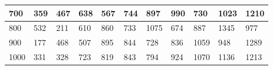 \documentclass[10pt,letterpaper]{article}
\begin{document}
\begin{center}
\begin{table}
\begin{tabular} { |m{0.5cm}|m{1.3cm}|m{1.3cm}|m{1.3cm}|m{1.3cm}|m{1.3cm}|m{1.3cm}|m{1.3cm}|m{1.3cm}|m{1.3cm}|m{1.3cm}|}
\hline
\cellcolor{Gray}700 & \Large 359 & \Large 467 & \Large 638 & \Large 567 & \Large 744 & \Large 897 & \Large 990 & \Large 730 & \Large 1023 & \Large 1210 \\
\hline
\cellcolor{Gray}800 & \Large 532 & \Large 211 & \Large 610 & \Large 860 & \Large 733 & \Large 1075 & \Large 674 & \Large 887 & \Large 1345 & \Large 977 \\
\hline
\cellcolor{Gray}900 & \Large 177 & \Large 468 & \Large 507 & \Large 895 & \Large 844 & \Large 728 & \Large 836 & \Large 1059 & \Large 948 & \Large 1289 \\
\hline
\cellcolor{Gray}1000 & \Large 331 & \Large 328 & \Large 723 & \Large 819 & \Large 843 & \Large 794 & \Large 924 & \Large 1070 & \Large 1136 & \Large 1213 \\
\hline
\end{tabular} \\
\end{table}
\end{center}
\newpage 
{}
\end{document}
